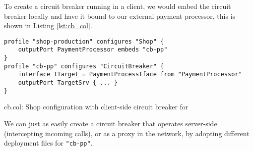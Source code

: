 To create a circuit breaker running in a client, we would embed the circuit
breaker locally and have it bound to our external payment processor, this is
shown in Listing \ref{lst:cb_col}.

\begin{listing}[H]
\begin{verbatim}
profile "shop-production" configures "Shop" {
    outputPort PaymentProcessor embeds "cb-pp"
}
profile "cb-pp" configures "CircuitBreaker" {
    interface ITarget = PaymentProcessIface from "PaymentProcessor"
    outputPort TargetSrv { ... }
}
\end{verbatim}

\caption{cb.col: Shop configuration with client-side circuit breaker for
    }

\label{lst:cb_col}

\end{listing}

We can just as easily create a circuit breaker that operates server-side
(intercepting incoming calls), or as a proxy in the network, by adopting
different deployment files for \lstinline|"cb-pp"|.
